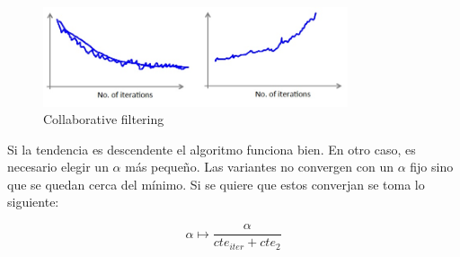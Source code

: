 \documentclass[12pt,a4paper]{article}
\begin{document}
\begin{figure}[htb]
\center
\includegraphics[width=0.8\textwidth]{cost_func}
\caption{Collaborative filtering}
\end{figure}

Si la tendencia es descendente el algoritmo funciona bien. En otro caso, es necesario elegir un $\alpha$ más pequeño. Las variantes no convergen con un $\alpha$ fijo sino que se quedan cerca del mínimo. Si se quiere que estos converjan se toma lo siguiente:

\begin{equation*}
\alpha \longmapsto \dfrac{\alpha}{cte_{iter}+cte_2}
\end{equation*}






\appendix






\renewcommand{\bibname}{Referencias}
        

\end{document}
